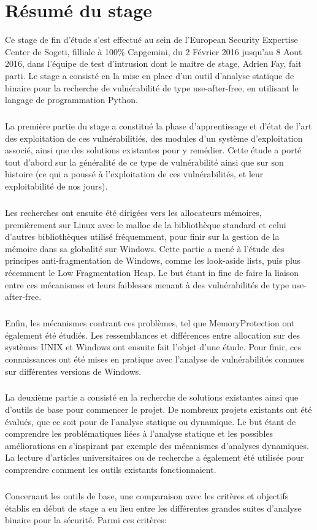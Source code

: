 \section*{Résumé du stage}
Ce stage de fin d'étude s'est effectué au sein de l'European Security Expertise Center de Sogeti, filliale à 100\% Capgemini, du 2 Février 2016 jusqu'au 8 Aout 2016, dans
l'équipe de test d'intrusion dont le maitre de stage, Adrien Fay, fait parti. Le stage a consisté en la mise en place d'un outil d'analyse statique de binaire pour la recherche
de vulnérabilité de type use-after-free, en utilisant le langage de programmation Python.
\subparagraph{}
La première partie du stage a constitué la phase d'apprentissage et d'état de l'art des exploitation de ces vulnérabilitiés, des modules d'un système d'exploitation associé, ainsi que des solutions
existantes pour y remédier. Cette étude a porté tout d'abord sur la généralité de ce type de vulnérabilité ainsi que sur son histoire (ce qui a poussé à l'exploitation de ces vulnérabilités, et leur
exploitabilité de nos jours).
\subparagraph{}
Les recherches ont ensuite été dirigées vers les allocateurs mémoires, premièrement sur Linux avec le malloc de la bibliothèque standard et celui d'autres bibliothèques
utilisé fréquemment, pour finir sur la gestion de la mémoire dans sa globalité sur Windows. Cette partie a mené à l'étude des principes anti-fragmentation de Windows, comme les look-aside lists, puis
plus récemment le Low Fragmentation Heap. Le but étant in fine de faire la liaison entre ces mécanismes et leurs faiblesses menant à des vulnérabilités de type use-after-free.
\subparagraph{}
Enfin, les mécanismes contrant ces problèmes, tel que MemoryProtection ont également été étudiés. Les ressemblances et différences entre allocation sur des systèmes UNIX et Windows ont
ensuite fait l'objet d'une étude. Pour finir, ces connaissances ont été mises en pratique avec l'analyse de vulnérabilités connues sur différentes versions de Windows.
\subparagraph{}
La deuxième partie a consisté en la recherche de solutions existantes ainsi que d'outils de base pour commencer le projet. De nombreux projets existants ont été évalués, que ce soit pour de l'analyse statique ou dynamique. Le but étant de comprendre les problématiques liées à l'analyse statique et les possibles améliorations en s'inspirant par exemple des mécanismes d'analyses dynamiques.
La lecture d'articles universitaires ou de recherche a également été utilisée pour comprendre comment les outils existants fonctionnaient.
\subparagraph{}
Concernant les outils de base, une comparaison avec les critères et objectifs établis en début de stage a eu lieu entre les différentes grandes suites d'analyse binaire pour la sécurité. Parmi ces critères:
